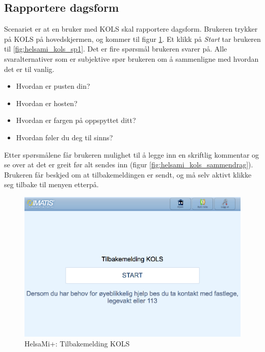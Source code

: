 \subsection{Rapportere dagsform}
Scenariet er at en bruker med KOLS skal rapportere dagsform. Brukeren trykker på KOLS på hovedskjermen,
og kommer til figur \ref{fig:helsami_kols_start}. Et klikk på \textit{Start} tar brukeren til \ref{fig:helsami_kols_sp1}.
Det er fire spørsmål brukeren svarer på. Alle svaralternativer som er subjektive spør brukeren om å sammenligne med
hvordan det er til vanlig.

\begin{itemize}
  \tightlist
  \item Hvordan er pusten din?
  \item Hvordan er hosten?
  \item Hvordan er fargen på oppspyttet ditt?
  \item Hvordan føler du deg til sinns?
\end{itemize}

Etter spørsmålene får brukeren mulighet til å legge inn en skriftlig kommentar og se over at det er greit
før alt sendes inn (figur \ref{fig:helsami_kols_sammendrag}). Brukeren får beskjed om at tilbakemeldingen er sendt,
og må selv aktivt klikke seg tilbake til menyen etterpå.

\begin{figure}
\includegraphics[width=1.0\textwidth,center]{fig/helsami/kols_start}
\caption{HelsaMi+: Tilbakemelding KOLS}
\label{fig:helsami_kols_start}
\end{figure}

